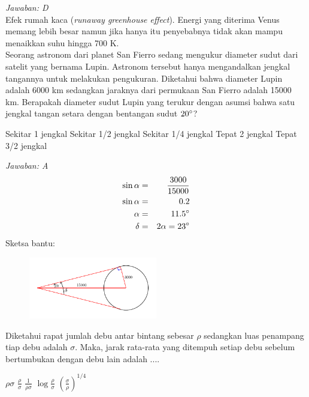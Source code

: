 \documentclass[11pt,fleqn]{exam}
\begin{document}
\begin{questions}
\textit{Jawaban: D}\\
Efek rumah kaca (\textit{runaway greenhouse effect}). Energi yang diterima Venus memang lebih besar namun jika hanya itu penyebabnya tidak akan mampu menaikkan suhu hingga 700 K.\\


\question Seorang astronom dari planet San Fierro sedang mengukur diameter sudut dari satelit yang bernama Lupin. Astronom tersebut hanya mengandalkan jengkal tangannya untuk melakukan pengukuran. Diketahui bahwa diameter Lupin adalah 6000 km sedangkan jaraknya dari permukaan San Fierro adalah 15000 km. Berapakah diameter sudut Lupin yang terukur dengan asumsi bahwa satu jengkal tangan setara dengan bentangan sudut $20\degree$?
\begin{choices}
\choice Sekitar 1 jengkal
\choice Sekitar 1/2 jengkal
\choice Sekitar 1/4 jengkal
\choice Tepat 2 jengkal
\choice Tepat 3/2 jengkal
\end{choices}

\textit{Jawaban: A}
\begin{eqnarray*}
\sin{\alpha} &=& \frac{3000}{15000}\\
\sin{\alpha} &=& 0.2\\
\alpha &=& 11.5\degree\\
\delta &=& 2 \alpha = 23\degree
\end{eqnarray*}
Sketsa bantu:
\begin{figure}[H]
\centering
\includegraphics[width=0.5\textwidth]{gambar/diametersudut.pdf}
\end{figure}


\question Diketahui rapat jumlah debu antar bintang sebesar $\rho$ sedangkan luas penampang tiap debu adalah $\sigma$. Maka, jarak rata-rata yang ditempuh setiap debu sebelum bertumbukan dengan debu lain adalah ....
\begin{choices}
\choice $\rho\sigma$
\choice $\frac{\rho}{\sigma}$
\choice $\frac{1}{\rho\sigma}$
\choice $\log \frac{\rho}{\sigma}$
\choice $\left(\frac{\sigma}{\rho}\right)^{1/4}$
\end{choices}


\end{questions}
\end{document}
